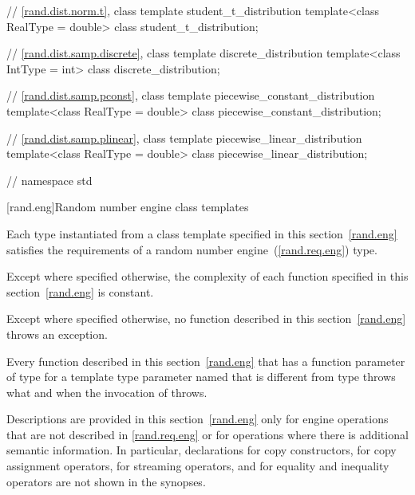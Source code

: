 \begin{codeblock}
{ // \ref{rand.dist.norm.t}, class template student_t_distribution
 template<class RealType = double>
   class student_t_distribution;

 // \ref{rand.dist.samp.discrete}, class template discrete_distribution
 template<class IntType = int>
   class discrete_distribution;

 // \ref{rand.dist.samp.pconst}, class template piecewise_constant_distribution
 template<class RealType = double>
   class piecewise_constant_distribution;

 // \ref{rand.dist.samp.plinear}, class template piecewise_linear_distribution
 template<class RealType = double>
   class piecewise_linear_distribution;

} // namespace std
\end{codeblock}%
%




[rand.eng]{Random number engine class templates}%

\pnum
Each type instantiated
from a class template specified in this section~\ref{rand.eng}
satisfies the requirements
of a random number engine~(\ref{rand.req.eng}) type.

\pnum
Except where specified otherwise,
the complexity of each function
specified in this section~\ref{rand.eng}
is constant.

\pnum
Except where specified otherwise,
no function described in this section~\ref{rand.eng}
throws an exception.

\pnum
Every function described in this section~\ref{rand.eng}
that has a function parameter  of type 
for a template type parameter named 
that is different from type 
throws what and when the invocation of  throws.

\pnum
Descriptions are provided in this section~\ref{rand.eng}
only for engine operations
that are not described in  \mbox{\ref{rand.req.eng}}
or for operations where there is additional semantic information.
In particular,
declarations for copy constructors,
for copy assignment operators,
for streaming operators,
and for equality and inequality operators
are not shown in the synopses.


